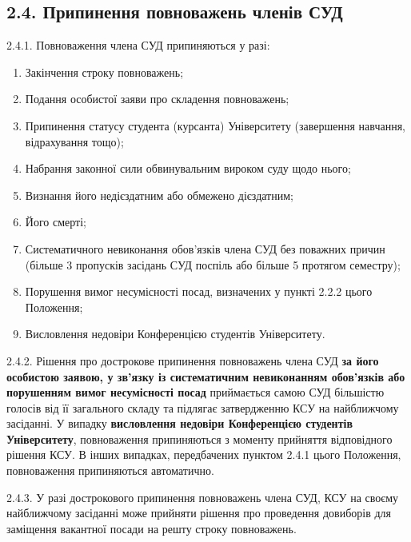 \subsection*{2.4. Припинення повноважень членів СУД}
    2.4.1. Повноваження члена СУД припиняються у разі:
        \begin{enumerate}[label=\alph*)]
            \item Закінчення строку повноважень;
            \item Подання особистої заяви про складення повноважень;
            \item Припинення статусу студента (курсанта) Університету (завершення навчання, відрахування тощо);
            \item Набрання законної сили обвинувальним вироком суду щодо нього;
            \item Визнання його недієздатним або обмежено дієздатним;
            \item Його смерті;
            \item Систематичного невиконання обов'язків члена СУД без поважних причин (більше 3 пропусків засідань СУД поспіль або більше 5 протягом семестру);
            \item Порушення вимог несумісності посад, визначених у пункті 2.2.2 цього Положення;
            \item Висловлення недовіри Конференцією студентів Університету.
        \end{enumerate}

    2.4.2. Рішення про дострокове припинення повноважень члена СУД \textbf{за його особистою заявою, у зв'язку із систематичним невиконанням обов'язків або порушенням вимог несумісності посад} приймається самою СУД більшістю голосів від її загального складу та підлягає затвердженню КСУ на найближчому засіданні. У випадку \textbf{висловлення недовіри Конференцією студентів Університету}, повноваження припиняються з моменту прийняття відповідного рішення КСУ. В інших випадках, передбачених пунктом 2.4.1 цього Положення, повноваження припиняються автоматично.

    2.4.3. У разі дострокового припинення повноважень члена СУД, КСУ на своєму найближчому засіданні може прийняти рішення про проведення довиборів для заміщення вакантної посади на решту строку повноважень. 